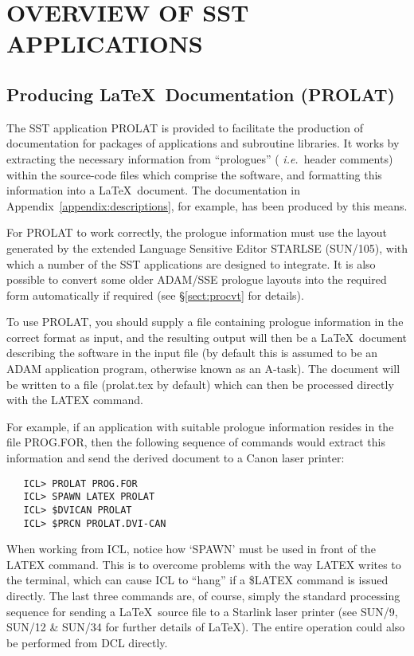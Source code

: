 \documentclass[twoside,11pt]{article}
\renewcommand{\_}{\texttt{\symbol{95}}}
\begin{document}
\section{OVERVIEW OF SST APPLICATIONS}

\subsection{Producing \LaTeX\ Documentation (PROLAT)}

The SST application PROLAT is provided to facilitate the production of
documentation for packages of applications and subroutine libraries.
It works by extracting the necessary information from ``prologues'' ({\em
i.e.}\ header comments) within the source-code files which comprise the
software, and formatting this information into a \LaTeX\ document.
The documentation in Appendix~\ref{appendix:descriptions}, for example, has
been produced by this means.

For PROLAT to work correctly, the prologue information must use the layout
generated by the extended Language Sensitive Editor STARLSE (SUN/105), with
which a number of the SST applications are designed to integrate.
It is also possible to convert some older ADAM/SSE prologue layouts into the
required form automatically if required (see \S\ref{sect:procvt} for
details).

To use PROLAT, you should supply a file containing prologue information in
the correct format as input, and the resulting output will then be a \LaTeX\
document describing the software in the input file (by default this is
assumed to be an ADAM application program, otherwise known as an A-task).
The document will be written to a file (prolat.tex by default) which can
then be processed directly with the LATEX command.

For example, if an application with suitable prologue information resides in
the file PROG.FOR, then the following sequence of commands would extract this
information and send the derived document to a Canon laser printer:

\begin{verbatim}
   ICL> PROLAT PROG.FOR
   ICL> SPAWN LATEX PROLAT
   ICL> $DVICAN PROLAT
   ICL> $PRCN PROLAT.DVI-CAN
\end{verbatim}

When working from ICL, notice how `SPAWN' must be used in front of the LATEX
command.
This is to overcome problems with the way LATEX writes to the terminal, which
can cause ICL to ``hang'' if a \$LATEX command is issued directly.
The last three commands are, of course, simply the standard processing
sequence for sending a \LaTeX\ source file to a Starlink laser printer (see
SUN/9, SUN/12 \& SUN/34 for further details of \LaTeX).
The entire operation could also be performed from DCL directly.
\end{document}
